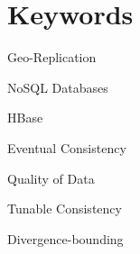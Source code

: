 \section*{Keywords}

{\large %

\noindent Geo-Replication

\noindent NoSQL Databases

\noindent HBase

\noindent Eventual Consistency

\noindent Quality of Data

\noindent Tunable Consistency

\noindent Divergence-bounding

}

\vfill

\cleardoublepage



\pagestyle{plain}



\def\contentsname{Index}
\tableofcontents
\newpage

\listoffigures
\newpage

\listoftables

\cleardoublepage


